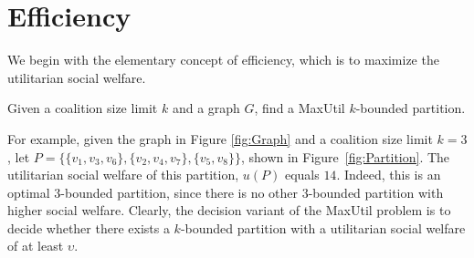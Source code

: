 \documentclass[sigconf,anonymous]{aamas}
\begin{document}
\section{Efficiency} %
We begin with the elementary concept of efficiency, which is to maximize the utilitarian social welfare.

\begin{definition}
Given a coalition size limit $k$ and a graph $G$, find a MaxUtil $k$-bounded partition.


\end{definition}
For example, given the graph in Figure \ref{fig:Graph} and a coalition size limit $k=3$, let $P = \{\{v_1,v_3,v_6\}, \allowbreak \{v_2,v_4,v_7\}, \{v_5,v_8\}\}$, shown in Figure~\ref{fig:Partition}. The utilitarian social welfare of this partition, $u(P)$ equals $14$. Indeed, this is an optimal $3$-bounded partition, since there is no other $3$-bounded partition with higher social welfare.
Clearly, the decision variant of the MaxUtil problem is to decide whether there exists a $k$-bounded partition with a utilitarian social welfare of at least $\upsilon$.


\end{document}
